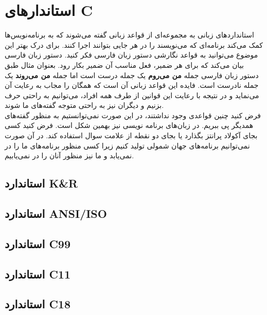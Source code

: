 \chapter{استاندارهای C}
استانداردهای زبانی به مجموعه‌ای از قواعد زبانی گفته می‌شوند که به برنامه‌نویس‌ها کمک می‌کند برنامه‌ای که می‌نویسند را در هر جایی بتوانند اجرا کنند. برای درک بهتر این موضوع می‌توانید به قواعد نگارشی دستور زبان فارسی فکر کنید. دستور زبان فارسی بیان می‌کند که برای هر ضمیر، فعل مناسب آن ضمیر بکار رود. بعنوان مثال طبق دستور زبان فارسی جمله \textbf{من می‌روم} یک جمله درست است اما جمله \textbf{من می‌روند} یک جمله نادرست است. فایده این قواعد زبانی آن است که همگان را مجاب به رعایت آن می‌نماید و در نتیجه با رعایت این قوانین از طرف همه افراد، می‌توانیم به راحتی حرف بزنیم و دیگران نیز به راحتی متوجه گفته‌های ما شوند.\\
فرض کنید چنین قواعدی وجود نداشتند، در این صورت نمی‌توانستیم به منظور گفته‌های همدیگر پی ببریم. در زبان‌های برنامه نویسی نیز بهمین شکل است. فرض کنید کسی بجای آکولاد پرانتز بگذارد یا بجای دو نقطه از علامت سوال استفاده کند. در آن صورت نمی‌توانیم برنامه‌های جهان شمولی تولید کنیم زیرا کسی منظور برنامه‌های ما را در نمی‌یابد و ما نیز منظور آنان را در نمی‌یابیم. 
\section{استاندارد K\&R}
\section{استاندارد ANSI/ISO}
\section{استاندارد C99}
\section{استاندارد C11}
\section{استاندارد C18}

